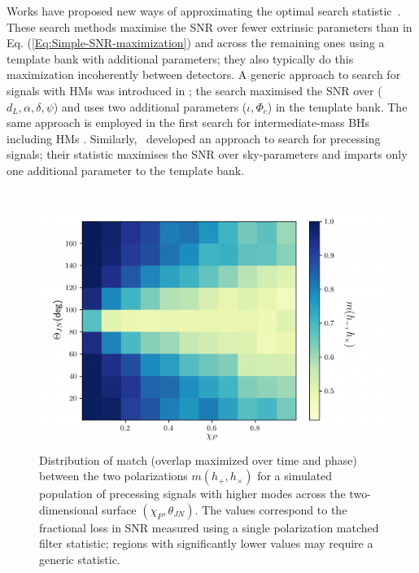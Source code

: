 Works have proposed new ways of approximating the optimal search statistic~\cite{Harry:2016ijz, Harry:2017weg}. These search methods maximise the SNR over fewer extrinsic parameters than in Eq. (\ref{Eq:Simple-SNR-maximization}) and across the remaining ones using a template bank with additional parameters; they also typically do this maximization incoherently between detectors. A generic approach to search for signals with HMs was introduced in \cite{Harry:2017weg}; the search maximised the SNR over ($d_L, \alpha, \delta, \psi$) and uses two additional parameters ($\iota, \Phi_c$) in the template bank. The same approach is employed in the first search for intermediate-mass BHs including HMs \cite{Chandra:2022ixv}. Similarly,~\cite{Harry:2016ijz} developed an approach to search for precessing signals; their statistic maximises the SNR over sky-parameters and imparts only one additional parameter to the template bank. 


\begin{figure}
    \centering
    \includegraphics[width=\linewidth]{figures/HM_and_precession/hplus_hcross.pdf}
    \caption{ Distribution of match (overlap maximized over time and phase) between the two polarizations $m(h_{+},h_{\times})$ for a simulated population of precessing signals with higher modes across the two-dimensional surface $(\chi_P, \theta_{JN})$. The values correspond to the fractional loss in SNR measured using a single polarization matched filter statistic; regions with significantly lower values may require a generic statistic.} 
    \label{fig:hplus_hcross}
\end{figure}

